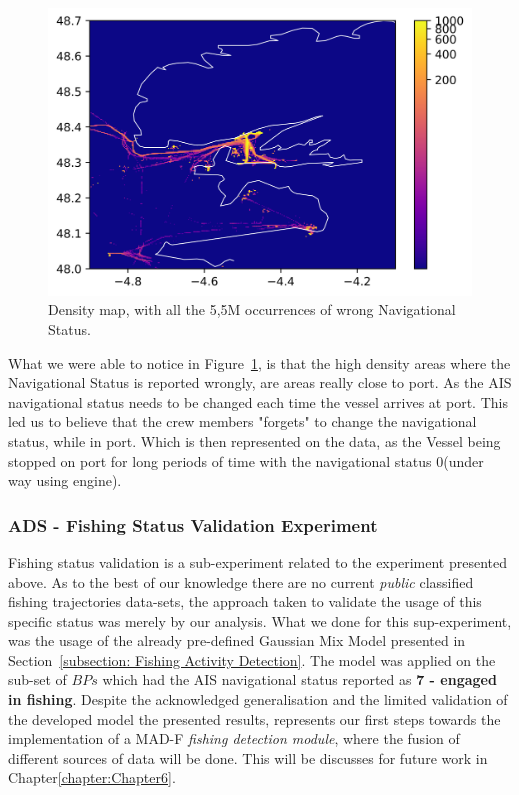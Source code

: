 \begin{figure}[H]
	\centering
	\includegraphics[scale=1]{figures/Ch5/ThesisExpStatusDensityZoom.png}
    \caption{Density map, with all the 5,5M occurrences of wrong Navigational Status.}
    \label{fig: 5 Exp StatusDensityMap}
\end{figure}

What we were able to notice in Figure~\ref{fig: 5 Exp StatusDensityMap}, is that the high density areas where the Navigational Status is reported wrongly, are areas really close to port. As the AIS navigational status needs to be changed each time the vessel arrives at port. This led us to believe that the crew members "forgets" to change the navigational status, while in port. Which is then represented on the data, as the Vessel being stopped on port for long periods of time with the navigational status 0(under way using engine). 

\subsubsection{ADS - Fishing Status Validation Experiment}
Fishing status validation is a sub-experiment related to the experiment presented above. As to the best of our knowledge there are no current \emph{public} classified fishing trajectories data-sets, the approach taken to validate the usage of this specific status was merely by our analysis. What we done for this sup-experiment, was the usage of the already pre-defined Gaussian Mix Model presented in Section~\ref{subsection: Fishing Activity Detection}. The model was applied on the sub-set of $BPs$ which had the AIS navigational status reported as \textbf{7 - engaged in fishing}. Despite the acknowledged generalisation and the limited validation of the developed model the presented results, represents our first steps towards the implementation of a MAD-F \emph{fishing detection module}, where the fusion of different sources of data will be done. This will be discusses for future work in Chapter\ref{chapter:Chapter6}. 

